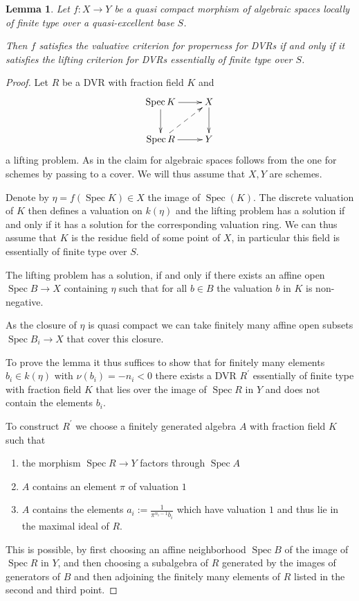 \documentclass[a4paper]{amsart}
\numberwithin{equation}{section}
\theoremstyle{plain}
\newtheorem{lem}[thm]{Lemma}
\theoremstyle{definition}
\DeclareMathOperator{\Spec}{Spec}
\begin{document}
\begin{lem}\label{lem:ess_fintype_criterion}
Let $f\colon X \to Y$ be a quasi compact morphism of algebraic spaces locally of finite type over a {quasi-}excellent base $S$. 
	
	Then $f$ satisfies the valuative criterion for properness for DVRs if and only if it satisfies the lifting criterion for DVRs essentially of finite type over $S$.
\end{lem}
\begin{proof}
Let $R$ be a DVR with fraction field $K$ and $$\xymatrix{ \Spec K \ar[d] \ar[r] & X \ar[d] \\ \Spec R \ar[r]\ar@{-->}[ur] & Y}$$ a lifting problem. As in \cite[TAG03K9]{stacks-project} the claim for algebraic spaces follows from the one for schemes by passing to a cover. We will thus assume that $X,Y$ are schemes.
	
	Denote by $\eta=f(\Spec K) \in X$ the image of $\Spec(K)$. The discrete valuation of $K$ then defines a valuation on $k(\eta)$ and the lifting problem has a solution if and only if it has a solution for the corresponding valuation ring. We can thus assume that $K$ is the residue field of some point of $X$, in particular this field is essentially of finite type over $S$.
	
	The lifting problem has a solution, if and only if there exists an affine open $\Spec B \to X$ containing $\eta$ such that for all $b\in B$ the valuation $b$ in  $K$ is non-negative.
	
	As the closure of $\eta$ is quasi compact we can take finitely many affine open subsets $\Spec B_i \to X$ that cover this closure.
	
	To prove the lemma it thus suffices to show that for finitely many elements $b_i \in k(\eta)$ with $\nu(b_i)=-n_i <0$ there exists a DVR $R^\prime$ essentially of finite type with fraction field $K$ that lies over the image of $\Spec R$ in $Y$ and does not contain the elements $b_i$. 
	
	To construct $R^\prime$ we choose a finitely generated algebra $A$ with fraction field $K$ such that\begin{enumerate}
		\item the morphism $\Spec R \to Y$ factors through $\Spec A$
		\item $A$ contains an element $\pi$ of valuation $1$
		\item $A$ contains the elements $a_i:=\frac{1}{\pi^{n_i-1}b_i}$ which have valuation $1$ and thus lie in the maximal ideal of $R$.
	\end{enumerate} 
	This is possible, by first choosing an affine neighborhood $\Spec B$ of the image of $\Spec R$ in $Y$, and then choosing a subalgebra of $R$ generated by the images of generators of $B$ and then adjoining the finitely many elements of $R$ listed in the second and third point. 
	

\end{proof}
\end{document}

